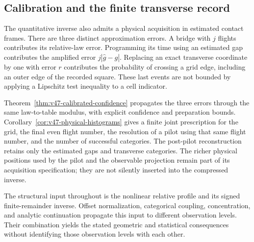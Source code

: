 \subsection{Calibration and the finite transverse record}
\label{subsec:v47-intro-calibration}

The quantitative inverse also admits a physical acquisition in estimated
contact frames.  There are three distinct approximation errors.  A bridge
with $j$ flights contributes its relative-law error.  Programming its time
using an estimated gap contributes the amplified error
$j|\widehat g-g|$.  Replacing an exact transverse coordinate by one with
error $r$ contributes the probability of crossing a grid edge, including
an outer edge of the recorded square.  These last events are not bounded
by applying a Lipschitz test inequality to a cell indicator.

Theorem~\ref{thm:v47-calibrated-confidence} propagates the three errors
through the same law-to-table modulus, with explicit confidence and
preparation bounds.  Corollary~\ref{cor:v47-physical-histograms} gives a
finite joint prescription for the grid, the final even flight number,
the resolution of a pilot using that same flight number, and the number
of successful categories.  The post-pilot reconstruction retains only
the estimated gaps and transverse categories.  The richer physical
positions used by the pilot and the observable projection remain part
of its acquisition specification; they are not silently inserted into
the compressed inverse.

The structural input throughout is the nonlinear relative profile and
its signed finite-remainder inverse.  Offset normalization, categorical
coupling, concentration, and analytic continuation propagate this input
to different observation levels.  Their combination yields the stated
geometric and statistical consequences without identifying those
observation levels with each other.
